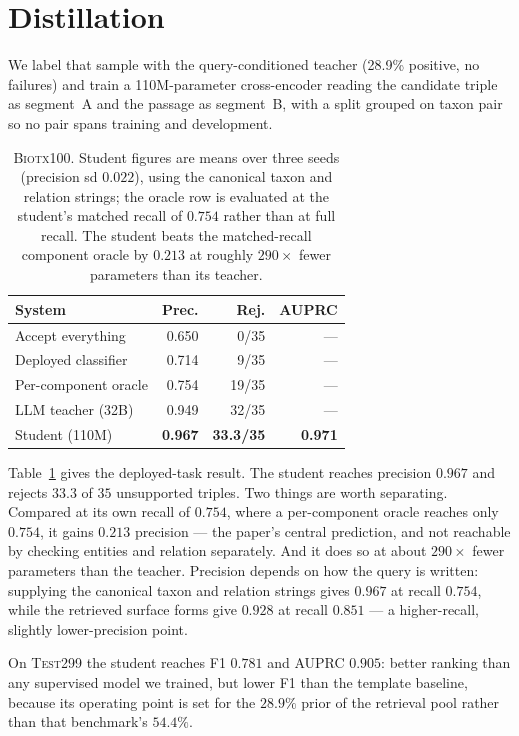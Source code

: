 \documentclass[11pt]{article}
\begin{document}
\section{Distillation}
\label{sec:distill}

We label that sample with the query-conditioned teacher (28.9\% positive, no failures) and train
a 110M-parameter cross-encoder reading the candidate triple as segment~A and the passage as
segment~B, with a split grouped on taxon pair so no pair spans training and development.

\begin{table}[t]\centering\small
\begin{tabular}{lrrr}
\toprule
System & Prec. & Rej. & AUPRC \\
\midrule
Accept everything          & 0.650 & 0/35 & --- \\
Deployed classifier        & 0.714 & 9/35 & --- \\
Per-component oracle       & 0.754 & 19/35 & --- \\
\midrule
LLM teacher (32B)          & 0.949 & 32/35 & --- \\
Student (110M)             & \textbf{0.967} & \textbf{33.3/35} & \textbf{0.971} \\
\bottomrule
\end{tabular}
\caption{\textsc{Biotx100}. Student figures are means over three seeds (precision sd $0.022$),
using the canonical taxon and relation strings; the oracle row is evaluated at the student's
matched recall of $0.754$ rather than at full recall. The student beats the matched-recall
component oracle by $0.213$ at roughly $290\times$ fewer parameters than its teacher.}
\label{tab:student}
\end{table}

Table~\ref{tab:student} gives the deployed-task result. The student reaches precision $0.967$ and
rejects $33.3$ of $35$ unsupported triples. Two things are worth separating. Compared at its own recall of $0.754$, where a per-component
oracle reaches only $0.754$, it gains $0.213$ precision --- the paper's central prediction, and
not reachable by checking entities and relation separately. And it does so at about $290\times$
fewer parameters than the teacher. Precision depends on how the query is written: supplying the
canonical taxon and relation strings gives $0.967$ at recall $0.754$, while the retrieved surface
forms give $0.928$ at recall $0.851$ --- a higher-recall, slightly lower-precision point.

On \textsc{Test299} the student reaches F1 $0.781$ and AUPRC $0.905$: better ranking than any
supervised model we trained, but lower F1 than the template baseline, because its operating point
is set for the $28.9\%$ prior of the retrieval pool rather than that benchmark's $54.4\%$.
\end{document}
